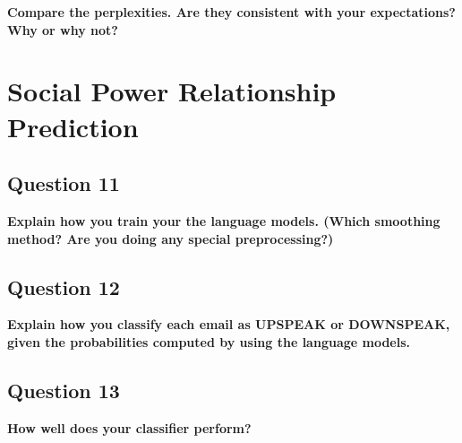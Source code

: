 \documentclass{article} %
\begin{document}
\textbf{Compare the perplexities. Are they consistent with your expectations? Why or why not?}
\\

\lipsum[2]

\section{Social Power Relationship Prediction}


\subsection*{Question 11}

\textbf{Explain how you train your the language models. (Which smoothing method? Are you doing any special preprocessing?)}
\\


\lipsum[2] %

\subsection*{Question 12}

\textbf{Explain how you classify each email as UPSPEAK or DOWNSPEAK, given the probabilities computed by using the language models.}


\lipsum[2]

\subsection*{Question 13}

\textbf{How well does your classifier perform?}


\lipsum[2]
\end{document}
